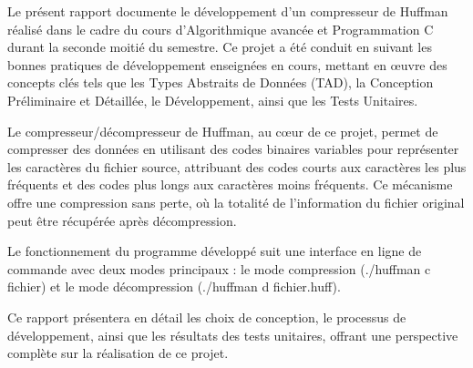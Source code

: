 Le présent rapport documente le développement d'un compresseur de Huffman réalisé dans le cadre du cours d'Algorithmique avancée et Programmation C durant la seconde moitié du semestre. Ce projet a été conduit en suivant les bonnes pratiques de développement enseignées en cours, mettant en œuvre des concepts clés tels que les Types Abstraits de Données (TAD), la Conception Préliminaire et Détaillée, le Développement, ainsi que les Tests Unitaires.

Le compresseur/décompresseur de Huffman, au cœur de ce projet, permet de compresser des données en utilisant des codes binaires variables pour représenter les caractères du fichier source, attribuant des codes courts aux caractères les plus fréquents et des codes plus longs aux caractères moins fréquents. Ce mécanisme offre une compression sans perte, où la totalité de l'information du fichier original peut être récupérée après décompression.

Le fonctionnement du programme développé suit une interface en ligne de commande avec deux modes principaux : le mode compression (./huffman c fichier) et le mode décompression (./huffman d fichier.huff).

Ce rapport présentera en détail les choix de conception, le processus de développement, ainsi que les résultats des tests unitaires, offrant une perspective complète sur la réalisation de ce projet.